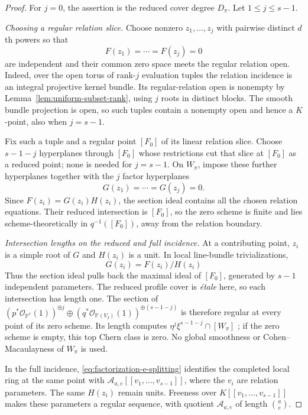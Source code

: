\documentclass[10pt,fleqn]{article}
\numberwithin{equation}{section}
\newcommand{\PP}{\mathbb P}
\begin{document}
\begin{proof}
For $j=0$, the assertion is the reduced cover degree $D_\pi$.
Let $1\le j\le s-1$.

\emph{Choosing a regular relation slice.}
Choose nonzero $z_1,\ldots,z_j$ with pairwise distinct $d$th powers
so that
\begin{equation}\label{v6:degree:evaluations}
 F(z_1)=\cdots=F(z_j)=0
\end{equation}
are independent and their common zero space meets the regular relation
open.  Indeed, over the open torus of rank-$j$ evaluation tuples the
relation incidence is an integral projective kernel bundle.  Its
regular-relation open is nonempty by Lemma~\ref{lem:uniform-subset-rank},
using $j$ roots in distinct blocks.  The smooth bundle projection is
open, so such tuples contain a nonempty open and hence a $K$-point,
also when $j=s-1$.

Fix such a tuple and a regular point $[F_0]$ of its linear relation
slice.  Choose $s-1-j$ hyperplanes through $[F_0]$ whose restrictions
cut that slice at $[F_0]$ as a reduced point; none is needed for $j=s-1$.
On $W_\pi$, impose these further hyperplanes together with the $j$
factor hyperplanes
\begin{equation}\label{v6:degree:factor-evaluations}
 G(z_1)=\cdots=G(z_j)=0.
\end{equation}
Since $F(z_i)=G(z_i)H(z_i)$, the section ideal contains all the
chosen relation equations.  Their reduced intersection is $[F_0]$,
so the zero scheme is finite and lies scheme-theoretically in
$q^{-1}([F_0])$, away from the relation boundary.

\emph{Intersection lengths on the reduced and full incidence.}
At a contributing point, $z_i$ is a simple root of $G$ and
$H(z_i)$ is a unit.  In local line-bundle trivializations,
\[
 G(z_i)=F(z_i)/H(z_i)
\]
Thus the section ideal pulls back the maximal ideal of $[F_0]$,
generated by $s-1$ independent parameters.  The reduced profile cover
is \emph{\'etale} here, so each intersection has length one.
The section of
$(p^*\mathcal O_{\PP^r}(1))^{\oplus j}\oplus
(q^*\mathcal O_{\PP(V_I)}(1))^{\oplus(s-1-j)}$
is therefore regular at every point of its zero scheme.  Its length
computes $\eta^j\xi^{s-1-j}\cap[W_\pi]$
\cite[Tag 0FA8, Lemma 42.44.1]{Stacks}; if the zero scheme is empty,
this top Chern class is zero.  No global smoothness or
Cohen--Macaulayness of $W_\pi$ is used.

In the full incidence, \eqref{eq:factorization-e-splitting} identifies
the completed local ring at the same point with
$\mathcal A_{a,e}[[v_1,\ldots,v_{s-1}]]$, where the $v_i$ are
relation parameters.  The same $H(z_i)$ remain units.  Freeness over
$K[[v_1,\ldots,v_{s-1}]]$ makes these parameters a regular sequence,
with quotient $\mathcal A_{a,e}$ of length $\binom ae$.


\end{proof}
\end{document}
